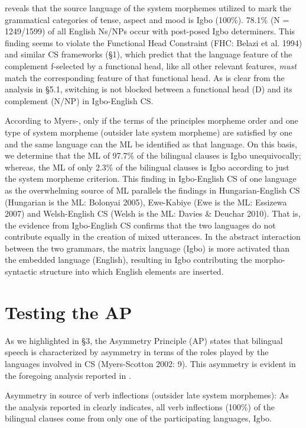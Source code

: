 \documentclass[output=paper]{langsci/langscibook}
\begin{document}
 reveals that the source language of the system morphemes utilized to mark the grammatical categories of tense, aspect and mood is Igbo (100\%). 78.1\% (N = 1249/1599) of all English Ns/NPs occur with post-posed Igbo determiners. This finding seems to violate the Functional Head Constraint (FHC: Belazi et al. 1994) and similar CS frameworks (§1), which predict that the language feature of the complement f-selected by a functional head, like all other relevant features, \textit{must} match the corresponding feature of that functional head. As is clear from the analysis in §5.1, switching is not blocked between a functional head (D) and its complement (N/NP) in Igbo-English CS. 

According to Myers-\citet[59]{Scotton2002}, only if the terms of the principles morpheme order and one type of system morpheme (outsider late system morpheme) are satisfied by one and the same language can the ML be identified as that language. On this basis, we determine that the ML of 97.7\% of the bilingual clauses is Igbo unequivocally; whereas, the ML of only 2.3\% of the bilingual clauses is Igbo according to just the system morpheme criterion. This finding in Igbo-English CS of one language as the overwhelming source of ML parallels the findings in Hungarian-English CS (Hungarian is the ML: Bolonyai 2005), Ewe-Kabiye (Ewe is the ML: Essizewa 2007) and Welsh-English CS (Welsh is the ML: Davies \& Deuchar 2010). That is, the evidence from Igbo-English CS confirms that the two languages do not contribute equally in the creation of mixed utterances. In the abstract interaction between the two grammars, the matrix language (Igbo) is more activated than the embedded language (English), resulting in Igbo contributing the morpho-syntactic structure into which English elements are inserted.  

\section{ Testing the AP}

As we highlighted in §3, the Asymmetry Principle (AP) states that bilingual speech is characterized by asymmetry in terms of the roles played by the languages involved in CS (Myers-Scotton 2002: 9). This asymmetry is evident in the foregoing analysis reported in . 

\begin{stylelsBulletList}
Asymmetry in source of verb inflections (outsider late system morphemes): As the analysis reported in  clearly indicates, all verb inflections (100\%) of the bilingual clauses come from only one of the participating languages, Igbo.
\end{stylelsBulletList}
\end{document}
